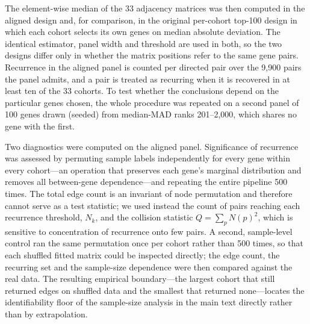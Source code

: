 \documentclass[11pt]{article}
\begin{document}
The element-wise median of the 33 adjacency matrices was then computed in the aligned design and, for comparison, in the original per-cohort top-100 design in which each cohort selects its own genes on median absolute deviation. The identical estimator, panel width and threshold are used in both, so the two designs differ only in whether the matrix positions refer to the same gene pairs. Recurrence in the aligned panel is counted per directed pair over the 9{,}900 pairs the panel admits, and a pair is treated as recurring when it is recovered in at least ten of the 33 cohorts. To test whether the conclusions depend on the particular genes chosen, the whole procedure was repeated on a second panel of 100 genes drawn (seeded) from median-MAD ranks 201--2{,}000, which shares no gene with the first.

Two diagnostics were computed on the aligned panel. Significance of recurrence was assessed by permuting sample labels independently for every gene within every cohort---an operation that preserves each gene's marginal distribution and removes all between-gene dependence---and repeating the entire pipeline 500 times. The total edge count is an invariant of node permutation and therefore cannot serve as a test statistic; we used instead the count of pairs reaching each recurrence threshold, $N_k$, and the collision statistic $Q = \sum_p N(p)^2$, which is sensitive to concentration of recurrence onto few pairs. A second, sample-level control ran the same permutation once per cohort rather than 500 times, so that each shuffled fitted matrix could be inspected directly; the edge count, the recurring set and the sample-size dependence were then compared against the real data. The resulting empirical boundary---the largest cohort that still returned edges on shuffled data and the smallest that returned none---locates the identifiability floor of the sample-size analysis in the main text directly rather than by extrapolation.
\end{document}
